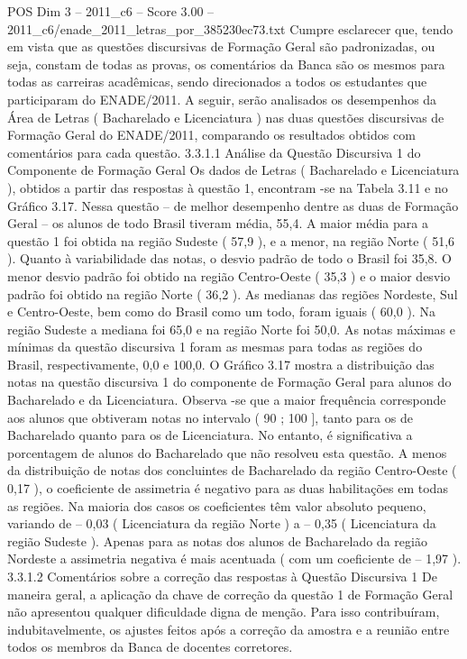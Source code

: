 \begin{textsample}{POS Dim 3 – 2011\_c6 – Score 3.00 – 2011\_c6/enade\_2011\_letras\_por\_385230ec73.txt}
Cumpre esclarecer que, tendo em vista que as questões discursivas de Formação Geral são padronizadas, ou seja, constam de todas as provas, os comentários da Banca são os mesmos para todas as carreiras acadêmicas, sendo direcionados a todos os estudantes que participaram do ENADE/2011.
A seguir, serão analisados os desempenhos da Área de Letras ( Bacharelado e Licenciatura ) nas duas questões discursivas de Formação Geral do ENADE/2011, comparando os resultados obtidos com comentários para cada questão. 3.3.1.1 Análise da Questão Discursiva 1 do Componente de Formação Geral Os dados de Letras ( Bacharelado e Licenciatura ), obtidos a partir das respostas à questão 1, encontram -se na Tabela 3.11 e no Gráfico 3.17.
Nessa questão – de melhor desempenho dentre as duas de Formação Geral – os alunos de todo Brasil tiveram média, 55,4.
A maior média para a questão 1 foi obtida na região Sudeste ( 57,9 ), e a menor, na região Norte ( 51,6 ).
Quanto à variabilidade das notas, o desvio padrão de todo o Brasil foi 35,8.
O menor desvio padrão foi obtido na região Centro-Oeste ( 35,3 ) e o maior desvio padrão foi obtido na região Norte ( 36,2 ).
As medianas das regiões Nordeste, Sul e Centro-Oeste, bem como do Brasil como um todo, foram iguais ( 60,0 ).
Na região Sudeste a mediana foi 65,0 e na região Norte foi 50,0.
As notas máximas e mínimas da questão discursiva 1 foram as mesmas para todas as regiões do Brasil, respectivamente, 0,0 e 100,0.
O Gráfico 3.17 mostra a distribuição das notas na questão discursiva 1 do componente de Formação Geral para alunos do Bacharelado e da Licenciatura.
Observa -se que a maior frequência corresponde aos alunos que obtiveram notas no intervalo ( 90 ; 100 ], tanto para os de Bacharelado quanto para os de Licenciatura.
No entanto, é significativa a porcentagem de alunos do Bacharelado que não resolveu esta questão.
A menos da distribuição de notas dos concluintes de Bacharelado da região Centro-Oeste ( 0,17 ), o coeficiente de assimetria é negativo para as duas habilitações em todas as regiões.
Na maioria dos casos os coeficientes têm valor absoluto pequeno, variando de – 0,03 ( Licenciatura da região Norte ) a – 0,35 ( Licenciatura da região Sudeste ).
Apenas para as notas dos alunos de Bacharelado da região Nordeste a assimetria negativa é mais acentuada ( com um coeficiente de – 1,97 ). 3.3.1.2 Comentários sobre a correção das respostas à Questão Discursiva 1 De maneira geral, a aplicação da chave de correção da questão 1 de Formação Geral não apresentou qualquer dificuldade digna de menção.
Para isso contribuíram, indubitavelmente, os ajustes feitos após a correção da amostra e a reunião entre todos os membros da Banca de docentes corretores.

\end{textsample}
